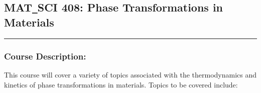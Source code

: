 	\subsection{MAT\texttt{\_}SCI 408: Phase Transformations in Materials}
	\vspace{-0.5em} \hfill \rule{0.4\textwidth}{.4pt}\newline
	\null \hfill {} \newline
	\null \hfill {}
\normalfont
		\subsubsection*{Course Description:}
This course will cover a variety of topics associated with the thermodynamics and kinetics of phase transformations in materials. Topics to be covered include:

